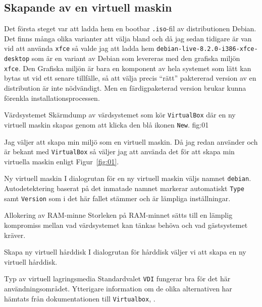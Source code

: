 \subsection{Skapande av en virtuell maskin}
Det första steget var att ladda hem en bootbar \texttt{.iso}-fil av
distributionen Debian. Det finns många olika varianter att välja bland och då
jag sedan tidigare är van vid att använda \texttt{xfce} så valde jag att ladda
hem \texttt{debian-live-8.2.0-i386-xfce-desktop} som är en variant av Debian
som levereras med den grafiska miljön \texttt{xfce}. Den Grafiska miljön är
bara en komponent av hela systemet som lätt kan bytas ut vid ett senare
tillfälle, så att välja precis ``rätt'' paktererad version av en distribution
är inte nödvändigt.  Men en färdigpaketerad version brukar kunna förenkla
installationsprocessen.

           {Värdsystemet}
           {Skärmdump av värdsystemet som kör \texttt{VirtualBox} där en ny
            virtuell maskin skapas genom att klicka den blå ikonen
            \texttt{New}.}
           {fig:01}

Jag väljer att skapa min miljö som en virtuell maskin. Då jag redan använder
och är bekant med \texttt{VirtualBox} så väljer jag att använda det för att
skapa min virtuella maskin enligt Figur~\ref{fig:01}.

           {Ny virtuell maskin}
           {I dialogrutan för en ny virtuell maskin väljs namnet
            \texttt{debian}. Autodetektering baserat på det inmatade
            namnet markerar automatiskt \texttt{Type} samt \texttt{Version}
            som i det här fallet stämmer och är lämpliga inställningar.}
           {}

           {Allokering av RAM-minne}
           {Storleken på RAM-minnet sätts till en lämplig kompromiss mellan
            vad värdsystemet kan tänkas behöva och vad gästsystemet kräver.}
           {}

           {Skapa ny virtuell hårddisk}
           {I dialogrutan för hårddisk väljer vi att skapa en ny virtuell
            hårddisk.}
           {}

           {Typ av virtuell lagringsmedia}
           {Standardvalet \texttt{VDI} fungerar bra för det här
            användningsområdet. Ytterigare information om de olika alternativen
            har hämtats från dokumentationen till \texttt{Virtualbox},
            \cite{virtualbox:vdidetails}.}
           {}

